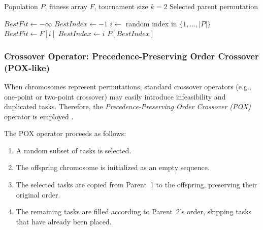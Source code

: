 \documentclass[12pt,a4paper]{article}
\begin{document}
\begin{algorithm}[H]
\caption{TournamentSelection ($k=2$)}
\label{alg:tournament}
\begin{algorithmic}[1]
\Require Population $P$, fitness array $F$, tournament size $k=2$
\Ensure Selected parent permutation

\State $BestFit \gets -\infty$
\State $BestIndex \gets -1$
    \State $i \gets$ random index in $\{1,\dots,|P|\}$
        \State $BestFit \gets F[i]$
        \State $BestIndex \gets i$
    \EndIf
\EndFor
\State \Return $P[BestIndex]$
\end{algorithmic}
\end{algorithm}



\subsubsection{Crossover Operator: Precedence-Preserving Order Crossover (POX-like)}
When chromosomes represent permutations, standard crossover operators (e.g., one-point or two-point crossover) may easily introduce infeasibility and duplicated tasks. Therefore, the \emph{Precedence-Preserving Order Crossover (POX)} operator is employed \cite{ParkKimLee2003}.

The POX operator proceeds as follows:
\begin{enumerate}
    \item A random subset of tasks is selected.
    \item The offspring chromosome is initialized as an empty sequence.
    \item The selected tasks are copied from Parent~1 to the offspring, preserving their original order.
    \item The remaining tasks are filled according to Parent~2's order, skipping tasks that have already been placed.
\end{enumerate}
\end{document}
